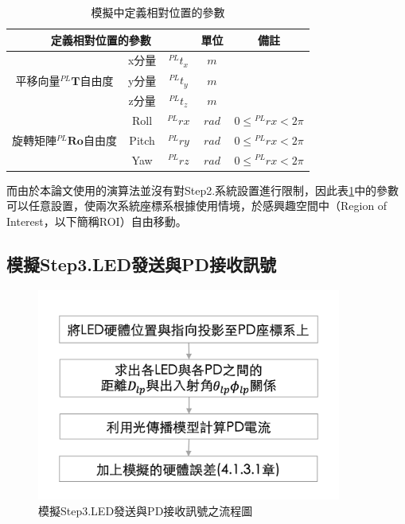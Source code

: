 \begin{table}[htpb]
    \renewcommand{\arraystretch}{1.3}
    \setlength{\arrayrulewidth}{0.15mm}
    \setlength{\doublerulesep}{0.12mm}
    \caption{模擬中定義相對位置的參數}
    \label{tab:para_relative}
    \centering
    \begin{tabular}{|c|cc|c|c|}
    \hline
    \multicolumn{3}{|c|}{\textbf{定義相對位置的參數}}  &\textbf{單位}  &  \textbf{備註}   \\
    \hline
    \multirow{3}{*}{平移向量$^{PL}\boldsymbol{T}$自由度} 
    & x分量 &$^{PL}t_x$ & $m$ &  \\
    & y分量 &$^{PL}t_y$ & $m$ &  \\
    & z分量 &$^{PL}t_z$ & $m$ &  \\
    \hline
    \multirow{3}{*}{旋轉矩陣$^{PL}\boldsymbol{Ro}$自由度} 
    & Roll &${^{PL}rx}$ & $rad$ &  $0\leq {^{PL}rx}<2\pi$\\
    & Pitch &$^{PL}ry$ & $rad$ & $0\leq {^{PL}rx}<2\pi$ \\
    & Yaw &$^{PL}rz$ & $rad$ & $0\leq {^{PL}rx}<2\pi$ \\
    \hline
    \end{tabular}
    \end{table}

    而由於本論文使用的演算法並沒有對Step2.系統設置進行限制，因此表\ref{tab:para_relative}中的參數可以任意設置，使兩次系統座標系根據使用情境，於感興趣空間中（Region of Interest，以下簡稱ROI）自由移動。

\subsection{模擬Step3.LED發送與PD接收訊號}
\label{chp:simulate_vlc}

    \begin{figure}[htpb]
        \centering
        \includegraphics[width=10cm]{ch4pic/simulate_signal_flow.png}
        \caption{模擬Step3.LED發送與PD接收訊號之流程圖}
        \label{pic:simulate_signal_flow}
    \end{figure}

